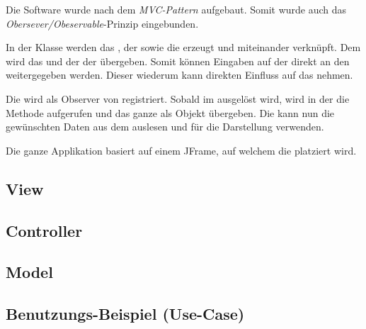 
Die Software wurde nach dem \emph{MVC-Pattern} aufgebaut. Somit wurde auch das
\emph{Obersever/Obeservable}-Prinzip eingebunden.

In   der    Klasse       werden   das    ,   der
   sowie   die      erzeugt   und   miteinander
verkn\"upft. Dem      wird   das     und   der
  der    \"ubergeben. Somit  k\"onnen  Eingaben
auf  der     direkt   an  den     weitergegeben
werden. Dieser wiederum kann direkten Einfluss auf das  nehmen.

Die    wird  als   Observer  von    registriert. Sobald
im      ausgel\"ost   wird,  wird  in  der
 die Methode   aufgerufen und das ganze 
als Objekt \"ubergeben. Die   kann nun die  gew\"unschten Daten aus
dem  auslesen und f\"ur die Darstellung verwenden.

Die ganze  Applikation basiert auf  einem JFrame, auf welchem  die 
platziert wird.

\subsection{View}
\label{subs:view}



\subsection{Controller}



\subsection{Model}



\subsection{Benutzungs-Beispiel (Use-Case)}

